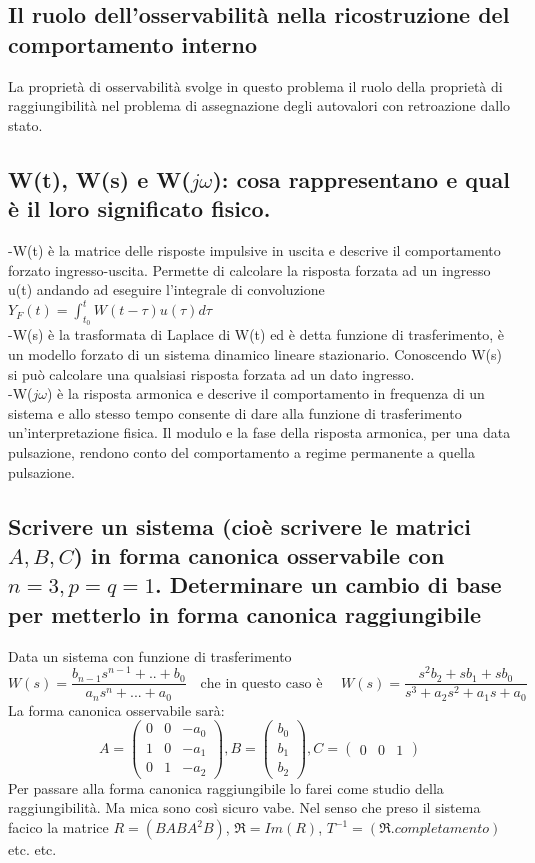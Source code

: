 \documentclass{article}
\begin{document}
\subsection{Il ruolo dell'osservabilità nella ricostruzione del comportamento interno}
La proprietà di osservabilità svolge in questo problema il
ruolo della proprietà di raggiungibilità nel problema
di assegnazione degli autovalori con retroazione dallo stato.


\subsection{W(t), W(s) e W($j\omega$): cosa rappresentano e qual è il loro significato fisico.}
-W(t) è la matrice delle risposte impulsive in uscita e descrive il comportamento forzato ingresso-uscita. Permette di calcolare la risposta forzata ad un ingresso u(t) andando ad eseguire l'integrale di convoluzione $Y_F(t)=\int_{t_0}^{t} W(t-\tau)u(\tau)d\tau $\\
-W(s) è la trasformata di Laplace di W(t) ed è detta funzione di trasferimento, è un modello forzato di un sistema dinamico lineare stazionario. Conoscendo W(s) si può calcolare una qualsiasi risposta forzata ad un dato ingresso.\\
-W($j\omega$) è la risposta armonica e descrive il comportamento in  frequenza di un sistema e allo stesso tempo consente di dare alla funzione di trasferimento un'interpretazione fisica. Il modulo e la fase della risposta armonica, per una data pulsazione, rendono conto del comportamento a regime permanente a quella pulsazione.


\subsection{Scrivere un sistema (cioè scrivere le matrici $A, B, C$)
in forma canonica osservabile con $n=3, p=q=1$.
Determinare un cambio di base per metterlo in forma canonica raggiungibile}

Data un sistema con funzione di trasferimento 
\[ 
    W(s) = \frac{b_{n-1}s^{n-1}+..+b_0}{a_ns^n+...+a_0}
    \quad\text{che in questo caso è }\quad W(s)=\frac{s^2b_2+sb_1+sb_0}{s^3+a_2s^2+a_1s+a_0}
\]
La forma canonica osservabile sarà:
\[
  A =   \begin{pmatrix}
    0 & 0 & -a_0\\
    1 & 0 & -a_1\\
    0 & 1 & -a_2
    \end{pmatrix},
  B = \begin{pmatrix} b_0\\b_1\\b_2 \end{pmatrix},
  C =  \begin{pmatrix} 0 & 0 &1 \end{pmatrix}
\]
Per passare alla forma canonica raggiungibile lo farei come studio della raggiungibilità.
\small Ma mica sono così sicuro vabe.
\large
Nel senso che preso il sistema facico la matrice $R = (B AB A^2B)$, $\mathfrak{R}=Im(R)$,
$T^{-1} = (\mathfrak{R} .completamento)$ etc. etc.
\end{document}
